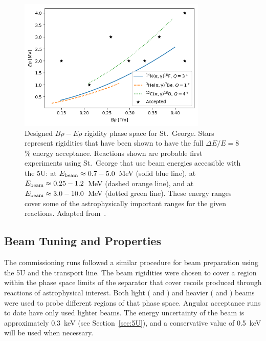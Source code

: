 \begin{figure}[t]
   \begin{center}
       \label{fig:rigidity-phase-space}
       \centerline{\includegraphics[width=0.8\textwidth]
           {figures/rigidity_phase_space.png}}
       \caption[Designed $B\rho-E\rho$ rigidity phase space for St.\ George]{
           Designed $B\rho-E\rho$ rigidity phase space for St.\ George. Stars
           represent rigidities that have been shown to have the full
           $\Delta E/E = 8$\,\% energy acceptance. Reactions shown are probable
           first experiments using St.\ George that use beam energies
           accessible with the 5U:
            at $E_{\rm{beam}}\approx 0.7-5.0$~MeV (solid blue line),
            at $E_{\rm{beam}}\approx 0.25-1.2$~MeV (dashed orange
           line), and
            at $E_{\rm{beam}}\approx 3.0-10.0$~MeV (dotted green
           line). These energy
           ranges cover some of the astrophysically important ranges for the
           given reactions.
           Adapted from~\cite{Meisel2017}.}
   \end{center}
\end{figure}


\subsection{Beam Tuning and Properties}
\label{sec:tuning}

The commissioning runs followed a similar procedure for beam preparation using
the 5U and the transport line. The beam rigidities were chosen to cover a
region within the phase space limits of the separator that cover recoils
produced through reactions of astrophysical interest. Both light (
and ) and heavier ( and ) beams were used to
probe different regions of that phase space. Angular acceptance runs to date
have only used lighter beams. The energy uncertainty of the beam is
approximately 0.3~keV (see Section~\ref{sec:5U}), and a conservative value of
0.5~keV will be used when necessary.

